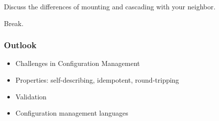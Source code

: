 \begin{assignment}
	\begin{task}
	Discuss the differences of mounting and cascading with your neighbor.
	\end{task}
\end{assignment}

\begin{assignment}
	\begin{task}
	Break.
	\end{task}
\end{assignment}


\begin{frame}
	\frametitle{Outlook}

	\begin{itemize}[<+-| alert@+>]
	\item Challenges in Configuration Management
	\item Properties: self-describing, idempotent, round-tripping
	\item Validation
	\item Configuration management languages
	\end{itemize}
\end{frame}



\appendix

\begin{frame}[allowframebreaks]
	
	
\end{frame}



